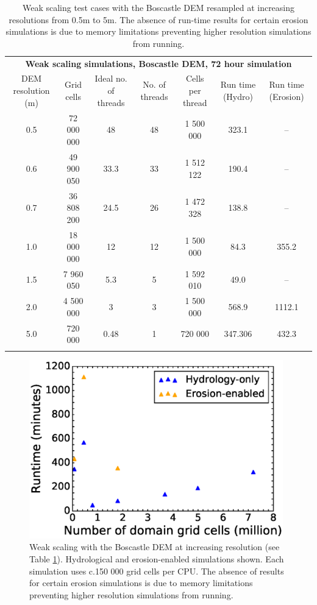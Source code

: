 \begin{table}
\caption{Weak scaling test cases with the Boscastle DEM resampled at increasing resolutions from 0.5m to 5m. The absence of run-time results for certain erosion simulations is due to memory limitations preventing higher resolution simulations from running.}
\resizebox{\textwidth}{!}
{%
\begin{tabular}{ccccccc}

\multicolumn{7}{c}{\textbf{Weak scaling simulations, Boscastle DEM, 72 hour simulation}} \\ 

DEM resolution (m)  &  Grid cells & Ideal no. of threads & No. of threads & Cells per thread & Run time (Hydro) & Run time (Erosion) \\ 
\hline
0.5 & 72 000 000 & 48    & 48 &  1 500 000 & 323.1 & --  \\
0.6 & 49 900 050 & 33.3 & 33 &  1 512 122 & 190.4 & -- \\
0.7 & 36 808 200 & 24.5 & 26 &  1 472 328 & 138.8 & -- \\
1.0 & 18 000 000 & 12    & 12 &  1 500 000 & 84.3 & 355.2 \\
1.5 & 7 960 050   & 5.3   &  5  &   1 592 010 & 49.0 & -- \\
2.0 & 4 500 000   & 3      &  3  &   1 500 000 & 568.9 & 1112.1 \\
5.0 & 720 000      & 0.48 & 1  &    720 000 & 347.306 & 432.3 \\ 
\hline \\
\end{tabular} 
}
\label{weak_scale_table}
\end{table}

\begin{figure}[t]
\includegraphics[width=11cm]{chp05_figures_scripts/weak_scale_bos.eps}
\caption{Weak scaling with the Boscastle DEM at increasing resolution (see Table \ref{weak_scale_table}). Hydrological and erosion-enabled simulations shown. Each simulation uses c.150 000 grid cells per CPU. The absence of results for certain erosion simulations is due to memory limitations preventing higher resolution simulations from running.}
\label{fig_weak_scale}
\end{figure}


